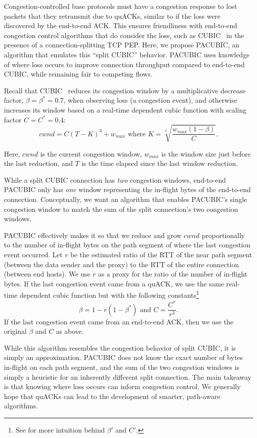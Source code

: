 Congestion-controlled base protocols must have a congestion response to lost
packets that they retransmit due to quACKs, similar to if the loss were
discovered by the end-to-end ACK.
This ensures friendliness with end-to-end congestion control algorithms that do
consider the loss, such as CUBIC~\cite{ha2008cubic} in the presence of a
connection-splitting TCP PEP.
Here, we propose PACUBIC, an algorithm that emulates this ``split CUBIC''
behavior. PACUBIC uses knowledge of where loss occurs to improve connection
throughput compared to end-to-end CUBIC, while remaining fair to competing flows.

Recall that CUBIC~\cite{ha2008cubic} reduces its congestion window by a
multiplicative decrease factor,
$\beta = \beta^* = 0.7$, when observing loss (a congestion event), and otherwise increases
its window based on a real-time dependent cubic function with scaling factor
$C=C^*=0.4$:
\[
cwnd = C(T-K)^3 + w_{max} \text{ where } K = \sqrt[3]{\frac{w_{max}(1-\beta)}{C}}.
\]

\noindent Here, $cwnd$ is the current congestion window,
$w_{max}$ is the window size just before the last reduction,
and $T$ is the time elapsed since the last window reduction.

While a split CUBIC connection has \emph{two} congestion windows,
end-to-end PACUBIC only has \emph{one} window representing the in-flight bytes
of the end-to-end connection.
Conceptually, we want an algorithm that enables PACUBIC's single
congestion window to match the sum of the split connection's two congestion
windows.

PACUBIC effectively makes it so that we reduce and grow $cwnd$
proportionally to the number of in-flight bytes on the path segment
of where the last congestion event occurred.
Let $r$ be the estimated ratio of the RTT of the near path segment
(between the data sender and the proxy) to the RTT of the entire connection
(between end hosts).
We use $r$ as a proxy for the ratio of the number of in-flight bytes.
If the last congestion event came from a quACK, we use the same real-time
dependent cubic function but with the following
constants\footnote{See  for more intuition behind $\beta'$ and $C'$.}
\[
\beta = 1 - r(1-\beta^*)\text{ and }C = \frac{C^*}{r^3}.
\]
\noindent If the last congestion event came from an end-to-end ACK, then we use
the original $\beta$ and $C$ as above.

While this algorithm resembles the congestion behavior of split CUBIC, it is
simply an approximation. PACUBIC does not know the exact number of bytes
in-flight on each path segment, and the sum of the two congestion windows is simply a
heuristic for an inherently different split connection. The main takeaway is
that knowing where loss occurs can inform congestion control. We generally
hope that quACKs can lead to the development of smarter, path-aware algorithms.
